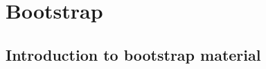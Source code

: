 
\chapter{Bootstrap}
\providecommand{\bootquantiles}{?}
\providecommand{\bootleft}{?}
\providecommand{\bootright}{?}
\providecommand{\medv}{?}
\providecommand{\powv}{?}
\providecommand{\ymedian}{?}
\providecommand{\bootinference}{?}

\section{Introduction to bootstrap material}

